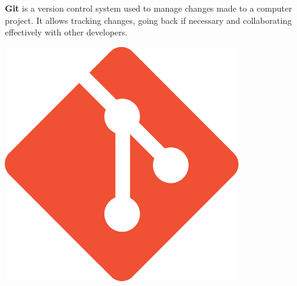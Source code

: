 \noindent%
\begin{minipage}{.7\textwidth}%
    \textbf{Git} is a version control system used to manage changes made to a computer project. It allows tracking changes, going back if necessary and collaborating effectively with other developers.
\end{minipage}%
\hfill
\begin{minipage}{.20\textwidth}%
\includegraphics[width=\textwidth]{images/git.png}
\end{minipage} \\ \\ \\

